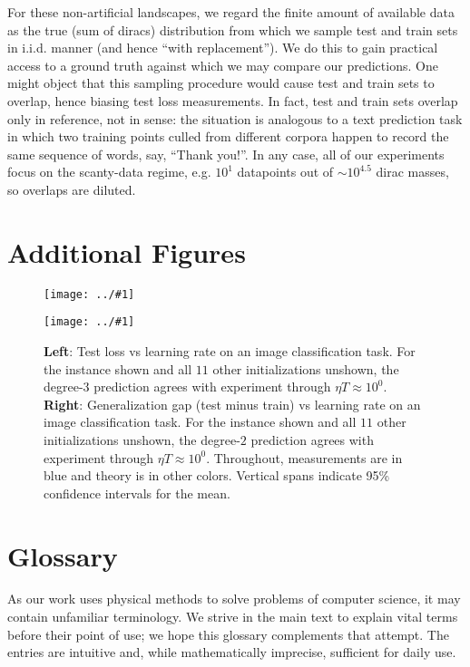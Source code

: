 \documentclass{article}
\newcommand{\plotmoo}[3]{
    \texttt{[image: ../\#1]}
}
\begin{document}
    For these non-artificial landscapes, we regard the finite amount of
    available data as the true (sum of diracs) distribution from which we
    sample test and train sets in i.i.d.  manner (and hence ``with
    replacement'').  We do this to gain practical access to a ground truth
    against which we may compare our predictions.  One might object that this
    sampling procedure would cause test and train sets to overlap, hence
    biasing test loss measurements.  In fact, test and train sets overlap only
    in reference, not in sense: the situation is analogous to a text prediction
    task in which two training points culled from different corpora happen to
    record the same sequence of words, say, ``Thank you!''.  In any case, all
    of our experiments focus on the scanty-data regime, e.g. $10^1$ datapoints
    out of $\sim 10^{4.5}$ dirac masses, so overlaps are diluted. 

\section{Additional Figures}\label{sect:figures}

    \begin{figure}[H]
        \centering
        \plotmoo{plots/test-vanilla-fashion}{0.48\columnwidth}{3.0cm} 
        \plotmoo{plots/gen-cifar}{0.48\columnwidth}{3.0cm}
        \caption{
            {\bf Left}: Test loss vs learning rate on an image
            classification task.  For the instance shown and all $11$ other
            initializations unshown, the degree-$3$ prediction agrees with
            experiment through $\eta T \approx 10^0$.
            {\bf Right}:
            Generalization gap (test minus train) vs learning rate on an
            image classification task.  For the instance shown and all $11$
            other initializations unshown, the degree-$2$ prediction agrees
            with experiment through $\eta T \approx 10^0$.  Throughout,
            measurements are in blue and theory is in other colors.
            Vertical spans indicate 95\% confidence intervals for the mean.
        }
    \end{figure}


\section{Glossary}\label{sect:glossary}

    As our work uses physical methods to solve problems of computer science, it
    may contain unfamiliar terminology.  We strive in the main text to explain
    vital terms before their point of use; we hope this glossary complements
    that attempt.  The entries are intuitive and, while mathematically
    imprecise, sufficient for daily use.
\end{document}
